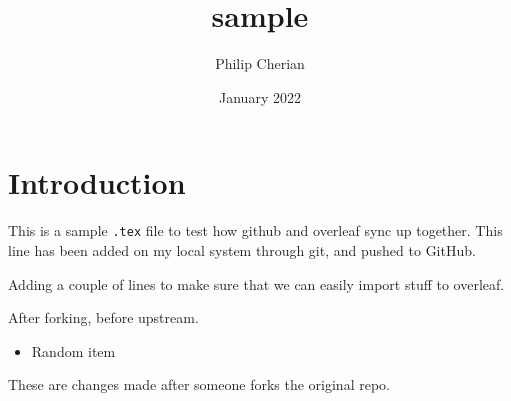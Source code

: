\documentclass{article}
\title{sample}
\author{Philip Cherian}
\date{January 2022}
\begin{document}
\maketitle

\section{Introduction}

This is a sample \texttt{.tex} file to test how github and overleaf sync up together. This line has been added on my local system through git, and pushed to GitHub.

Adding a couple of lines to make sure that we can easily import stuff to overleaf.

After forking, before upstream.

\begin{itemize}
\item Random item
\end{itemize}

These are changes made after someone forks the original repo.
\end{document}

